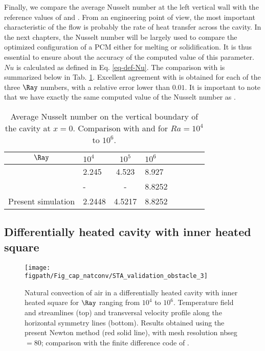 Finally, we compare the average Nusselt number at the left vertical wall with the reference values of \cite{de1983natural} and \cite{LeQuere91}.
From an engineering point of view, the most important characteristic of the flow is probably the rate of heat  transfer across the cavity.
In the next chapters, the Nusselt number will be largely used to compare the optimized configuration of a PCM either for melting or solidification.
It is thus essential to ensure about the accuracy of the computed value of this parameter.
$N\!u$ is calculated as defined in Eq. \ref{eq-def-Nu}.
The comparison with \cite{de1983natural} is summarized below in Tab. \ref{tab-Nu-natconv}.
Excellent agreement with \cite{de1983natural} is obtained for each of the three $\Ray$ numbers, with a relative error lower than $0.01$.
It is important to note that we have exactly the same computed value of the Nusselt number as \cite{LeQuere91}.
\begin{table}[!h]
   \begin{center}
      \begin{tabular}{*{4}{cl}}
         
       $\Ray$ & $10^4$ &$ 10^5$ & $10^6 $ \\
         \hline
        \cite{de1983natural} & 2.245 & 4.523  & 8.927 \\
        \cite{LeQuere91} & - & - &  8.8252 \\
        Present simulation & 2.2448 & 4.5217  & 8.8252 \\
      \end{tabular}
   \end{center}
   \caption{Average Nusselt number on the vertical boundary of the cavity at $x=0$. Comparison with \cite{de1983natural} and \cite{LeQuere91} for $Ra = 10^4$ to $10^6$.}
   \label{tab-Nu-natconv}
\end{table}


\subsection{Differentially heated cavity with inner heated square} \label{sub-2D-OBSTACLE}

\begin{figure}
	\begin{center}
		\texttt{[image: \\figpath/Fig\_cap\_natconv/STA\_validation\_obstacle\_3]} 
	\end{center}
	\caption{Natural convection of air in a differentially heated cavity with inner heated square for $\Ray$ ranging from $10^4$ to $10^6$. Temperature field and streamlines (top) and transversal velocity profile along the  horizontal symmetry lines (bottom). Results obtained using the present Newton method (red solid line), with mesh resolution nbseg $=80$; comparison with the finite difference code of \cite{Raluca2013}.}
	\label{fig-obst-2D}
\end{figure}

